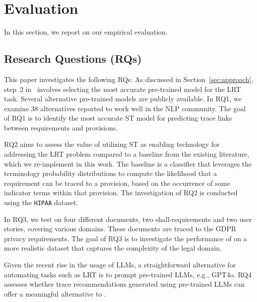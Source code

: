 \section{Evaluation}\label{sec:evaluation}
In this section, we report on our empirical evaluation. 

\subsection{Research Questions (RQs) }
This paper investigates the following RQs: 
As discussed in Section~\ref{sec:approach}, step~2 in \kashif~involves selecting the most accurate pre-trained model for the LRT task. 
Several alternative pre-trained models are publicly available. In RQ1, we examine 38 alternatives reported to work well in the NLP community. The goal of RQ1 is to identify the most accurate ST model for predicting trace links between requirements and provisions. 

RQ2 aims to assess the value of utilizing ST as enabling technology for addressing the LRT problem compared to a baseline  from the existing literature, which we re-implement in this work. The baseline is a classifier that 
leverages the terminology probability distributions to compute the likelihood that a requirement can be traced to a provision, based on the occurrence of some indicator terms within that provision.
The investigation of RQ2 is conducted using the \texttt{HIPAA} dataset. 

In RQ3, we test \kashif on four different documents, two shall-requirements and two user stories, covering various domains. These documents are traced to the GDPR privacy requirements. The goal of RQ3 is to investigate the performance of \kashif on a more realistic dataset that captures the complexity of the legal domain. 

Given the recent rise in the usage of LLMs, a straightforward alternative for automating tasks such as LRT is to prompt pre-trained LLMs, e.g., GPT4o. RQ4 assesses whether trace recommendations generated using pre-trained LLMs can offer a meaningful alternative to \kashif. 

